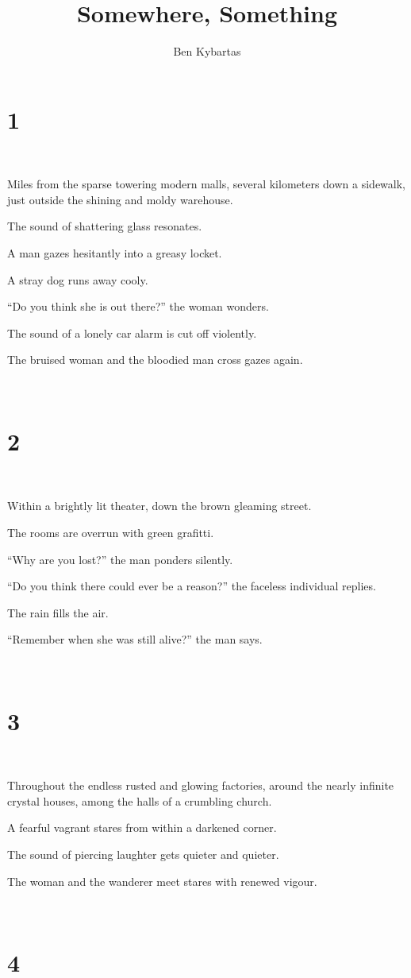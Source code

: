 \documentclass{report}
\title{Somewhere, Something}
\author{Ben Kybartas}
\date{}
\begin{document}
\maketitle\chapter*{1}
~

Miles from the sparse towering modern malls, several kilometers down a sidewalk, just outside the shining and moldy warehouse.

The sound of shattering glass resonates.

A man gazes hesitantly into a greasy locket.

A stray dog runs away cooly.

``Do you think she is out there?'' the woman wonders.

The sound of a lonely car alarm is cut off violently.

The bruised woman and the bloodied man cross gazes again.

~
\chapter*{2}
~

Within a brightly lit theater, down the brown gleaming street.

The rooms are overrun with green grafitti.

``Why are you lost?'' the man ponders silently.

``Do you think there could ever be a reason?'' the faceless individual replies.

The rain fills the air.

``Remember when she was still alive?'' the man says.

~
\chapter*{3}
~

Throughout the endless rusted and glowing factories, around the nearly infinite crystal houses, among the halls of a crumbling church.

A fearful vagrant stares from within a darkened corner.

The sound of piercing laughter gets quieter and quieter.

The woman and the wanderer meet stares with renewed vigour.

~
\chapter*{4}
~
\end{document}
